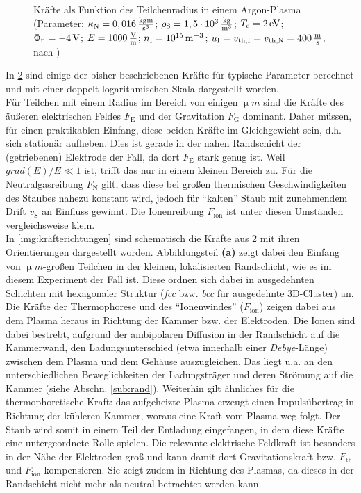 \documentclass[numbers=noenddot,a4paper]{scrartcl}
\newcommand{\tenpo}[1]{ 10^{#1}}
\newcommand{\ix}[1]{_\text{#1}}
\newcommand{\tilt}[1]{\textit{#1}}
\newcommand{\grad}[1]{\textit{grad}\left(#1\right)}
\newcommand{\fett}[1]{\textbf{#1}}
\begin{document}
\begin{figure}
\begin{subfigure}[t]{0.49\textwidth}
						\caption{}
						\label{img:rechtseq}
					\end{subfigure}
					\caption{Kräfte als Funktion des Teilchenradius in einem Argon-Plasma (Parameter: $\kappa\ix{N}=\unit[0,016]{\frac{kg m}{s^3}}$;  \mbox{$\rho\ix{S}=\unit[1,5\cdot\tenpo{3}]{\frac{kg}{m^3}}$}; $T\ix{e}=\unit[2]{eV}$; $\Phi\ix{fl}=\unit[-4]{V}$; $E=\unit[1000]{\frac{V}{m}}$; $n\ix{I}=\unit[\tenpo{15}]{m^{-3}}$; $u\ix{I}=v\ix{th,I}=v\ix{th,N}=\unit[400]{\frac{m}{s}}$, nach \cite{Melzer12}) }
					\label{img:kräfte}
				\end{figure}

			In \ref{img:kräfte} sind einige der bisher beschriebenen Kräfte für typische Parameter berechnet und mit einer doppelt-logarithmischen Skala dargestellt worden.\\
			Für Teilchen mit einem Radius im Bereich von einigen $\unit{\upmu m}$ sind die Kräfte des äußeren elektrischen Feldes $F\ix{E}$ und der Gravitation $F\ix{G}$ dominant. Daher müssen, für einen praktikablen Einfang, diese beiden Kräfte im Gleichgewicht sein, d.h. sich stationär aufheben. Dies ist gerade in der nahen Randschicht der (getriebenen) Elektrode der Fall, da dort $F\ix{E}$ stark genug ist. Weil $\grad{E}/E\ll1$ ist, trifft das nur in einem kleinen Bereich zu. Für die Neutralgasreibung $F\ix{N}$ gilt, dass diese bei großen thermischen Geschwindigkeiten des Staubes nahezu konstant wird, jedoch für "`kalten"' Staub mit zunehmendem Drift $v\ix{S}$ an Einfluss gewinnt. Die Ionenreibung $F\ix{ion}$ ist unter diesen Umständen vergleichsweise klein.\\
			In \ref{img:kräfterichtungen} sind schematisch die Kräfte aus \ref{img:kräfte} mit ihren Orientierungen dargestellt worden. Abbildungsteil \fett{(a)} zeigt dabei den Einfang von $\unit{\upmu m}$-großen Teilchen in der kleinen, lokalisierten Randschicht, wie es im diesem Experiment der Fall ist. Diese ordnen sich dabei in ausgedehnten Schichten mit hexagonaler Struktur (\tilt{fcc} bzw. \tilt{bcc} für ausgedehnte 3D-Cluster) an. Die Kräfte der Thermophorese und des "`Ionenwindes"' ($F\ix{ion}$) zeigen dabei aus dem Plasma heraus in Richtung der Kammer bzw. der Elektroden. Die Ionen sind dabei bestrebt, aufgrund der ambipolaren Diffusion in der Randschicht auf die Kammerwand, den Ladungsunterschied (etwa innerhalb einer \tilt{Debye}-Länge) zwischen dem Plasma und dem Gehäuse auszugleichen. Das liegt u.a. an den unterschiedlichen Beweglichkeiten der Ladungsträger und deren Strömung auf die Kammer (siehe Abschn. \ref{sub:rand}). Weiterhin gilt ähnliches für die thermophoretische Kraft: das aufgeheizte Plasma erzeugt einen Impulsübertrag in Richtung der kühleren Kammer, woraus eine Kraft vom Plasma weg folgt. Der Staub wird somit in einem Teil der Entladung eingefangen, in dem diese Kräfte eine untergeordnete Rolle spielen. Die relevante elektrische Feldkraft ist besonders in der Nähe der Elektroden groß und kann damit dort Gravitationskraft bzw. $F\ix{th}$ und $F\ix{ion}$ kompensieren. Sie zeigt zudem in Richtung des Plasmas, da dieses in der Randschicht nicht mehr als neutral betrachtet werden kann.
\end{document}
